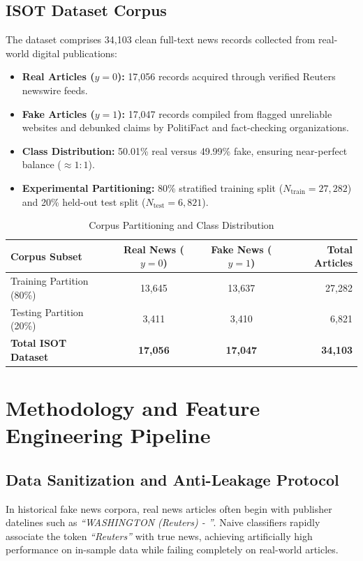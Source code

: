 \documentclass[11pt,a4paper]{article}
\begin{document}
\subsection{ISOT Dataset Corpus}
The dataset comprises 34,103 clean full-text news records collected from real-world digital publications:
\begin{itemize}[leftmargin=*]
    \item \textbf{Real Articles ($y = 0$):} 17,056 records acquired through verified Reuters newswire feeds.
    \item \textbf{Fake Articles ($y = 1$):} 17,047 records compiled from flagged unreliable websites and debunked claims by PolitiFact and fact-checking organizations.
    \item \textbf{Class Distribution:} 50.01\% real versus 49.99\% fake, ensuring near-perfect balance ($\approx 1:1$).
    \item \textbf{Experimental Partitioning:} 80\% stratified training split ($N_{\text{train}} = 27,282$) and 20\% held-out test split ($N_{\text{test}} = 6,821$).
\end{itemize}

\begin{table}[H]
\centering
\caption{Corpus Partitioning and Class Distribution}
\label{tab:dataset_stats}
\vspace{0.2cm}
\small
\begin{tabularx}{\columnwidth}{Xccr}
\toprule
\textbf{Corpus Subset} & \textbf{Real News ($y=0$)} & \textbf{Fake News ($y=1$)} & \textbf{Total Articles} \\
\midrule
Training Partition (80\%) & 13,645 & 13,637 & 27,282 \\
Testing Partition (20\%)  & 3,411  & 3,410  & 6,821  \\
\midrule
\textbf{Total ISOT Dataset} & \textbf{17,056} & \textbf{17,047} & \textbf{34,103} \\
\bottomrule
\end{tabularx}
\end{table}

\section{Methodology and Feature Engineering Pipeline}

\subsection{Data Sanitization and Anti-Leakage Protocol}
In historical fake news corpora, real news articles often begin with publisher datelines such as \textit{``WASHINGTON (Reuters) - ''}. Naive classifiers rapidly associate the token \textit{``Reuters''} with true news, achieving artificially high performance on in-sample data while failing completely on real-world articles. 
\end{document}
